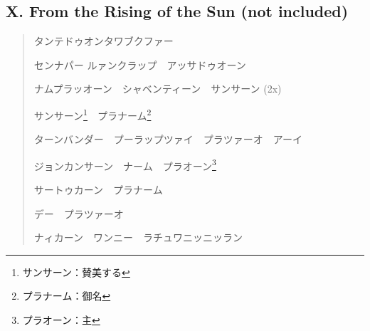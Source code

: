 \documentclass[a4paper, twocolumn]{article}
\begin{document}
\subsection*{X. From the Rising of the Sun (not included)}

\begin{quote}
タンテドゥオンタワブクファー\par
センナパー ルァンクラップ　アッサドゥオーン\par
ナムプラッオーン　シャベンティーン　サンサーン (2x)

\medskip
サンサーン\footnote{サンサーン：賛美する}　プラナーム\footnote{プラナーム：御名}\par
ターンバンダー　プーラップツァイ　プラツァーオ　アーイ\par
ジョンカンサーン　ナーム　プラオーン\footnote{プラオーン：主}\par
サートゥカーン　プラナーム\par
デー　プラツァーオ\par
ナィカーン　ワンニー　ラチュワニッニッラン
\end{quote}
\end{document}
